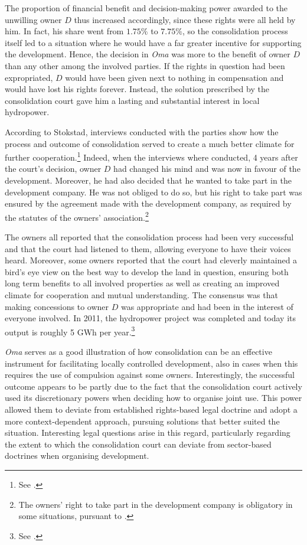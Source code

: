 The proportion of financial benefit and decision-making power awarded to the unwilling owner $D$ thus increased accordingly, since these rights were all held by him. In fact, his share went from $1.75 \%$ to $7.75 \%$, so the consolidation process itself led to a situation where he would have a far greater incentive for supporting the development. Hence, the decision in \emph{Oma} was more to the benefit of owner $D$ than any other among the involved parties. If the rights in question had been expropriated, $D$ would have been given next to nothing in compensation and would have lost his rights forever. Instead, the solution prescribed by the consolidation court gave him a lasting and substantial interest in local hydropower.

According to Stokstad, interviews conducted with the parties show how the process and outcome of consolidation served to create a much better climate for further cooperation.\footnote{See \cite[44-45]{stokstad11}.} Indeed, when the interviews where conducted, 4 years after the court's decision, owner $D$ had changed his mind and was now in favour of the development. Moreover, he had also decided that he wanted to take part in the development company. He was not obliged to do so, but his right to take part was ensured by the agreement made with the development company, as required by the statutes of the owners' association.\footnote{The owners' right to take part in the development company is obligatory in some situations, pursuant to \dni\cite[34 b) no 3]{lca79}.}

The owners all reported that the consolidation process had been very successful and that the court had listened to them, allowing everyone to have their voices heard. Moreover, some owners reported that the court had cleverly maintained a bird's eye view on the best way to develop the land in question, ensuring both long term benefits to all involved properties as well as creating an improved climate for cooperation and mutual understanding. The consensus was that making concessions to owner $D$ was appropriate and had been in the interest of everyone involved. In 2011, the hydropower project was completed and today its output is roughly 5 GWh per year.\footnote{See \cite[45]{stokstad11}.}

\emph{Oma} serves as a good illustration of how consolidation can be an effective instrument for facilitating locally controlled development, also in cases when this requires the use of compulsion against some owners. Interestingly, the successful outcome appears to be partly due to the fact that the consolidation court actively used its discretionary powers when deciding how to organise joint use. This power allowed them to deviate from established rights-based legal doctrine and adopt a more context-dependent approach, pursuing solutions that better suited the situation. Interesting legal questions arise in this regard, particularly regarding the extent to which the consolidation court can deviate from sector-based doctrines when organising development.

